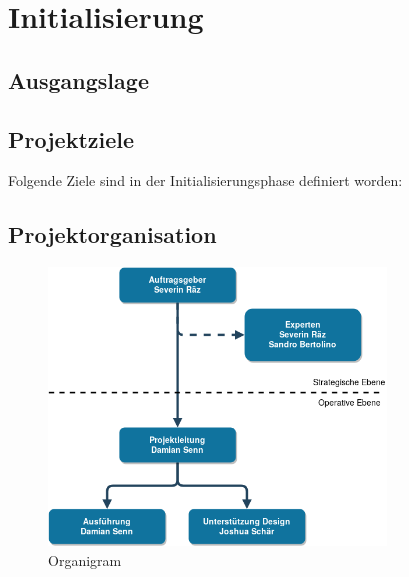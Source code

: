 \chapter{Initialisierung}

\label{ReportInitialisierung}

\section{Ausgangslage}



\clearpage
\section{Projektziele}

Folgende Ziele sind in der Initialisierungsphase definiert worden:



\clearpage

\section{Projektorganisation}

\begin{figure}[!htb]
  \centering
  \includegraphics[width=0.8\textwidth]{figures/organigram.png}
  \caption{Organigram}
\end{figure}



